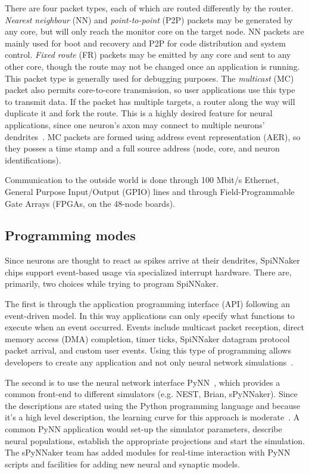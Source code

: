 There are four packet types, each of which are routed differently by the router. \emph{Nearest neighbour} (NN) and \emph{point-to-point} (P2P) packets may be generated by any core, but will only reach the monitor core on the target node. NN packets are mainly used for boot and recovery and P2P for code distribution and system control. \emph{Fixed route} (FR) packets may be emitted by any core and sent to any other core, though the route may not be changed once an application is running. This packet type is generally used for debugging purposes.
The \emph{multicast} (MC) packet also permits core-to-core transmission, so user applications use this type to transmit data. If the packet has multiple targets, a router along the way will duplicate it and fork the route. This is a highly desired feature for neural applications, since one neuron's axon may connect to multiple neurons' dendrites~\cite{spinn-net-patterson2012scalable}. MC packets are formed using address event representation (AER), so they posses a time stamp and a full source address (node, core, and neuron identifications).

Communication to the outside world is done through 100 Mbit/s Ethernet, General Purpose Input/Output (GPIO) lines and through Field-Programmable Gate Arrays (FPGAs, on the 48-node boards).

\subsection{Programming modes}
Since neurons are thought to react as spikes arrive at their dendrites, SpiNNaker chips support event-based usage via specialized interrupt hardware. There are, primarily, two choices while trying to program SpiNNaker. 

The first is through the application programming interface (API) following an event-driven model. In this way applications can only specify what functions to execute when an event occurred. Events include multicast packet reception, direct memory access (DMA) completion, timer ticks, SpiNNaker datagram protocol packet arrival, and custom user events. Using this type of programming allows developers to create any application and not only neural network simulations~\cite{spinn-software-docs}. 

The second is to use the neural network interface PyNN~\cite{davison2008pynn}, which provides a common front-end to different simulators (e.g. NEST, Brian, sPyNNaker). Since the descriptions are stated using the Python programming language and because it's a high level description, the learning curve for this approach is moderate~\cite{spynnaker-github}. A common PyNN application would set-up the simulator parameters, describe neural populations, establish the appropriate projections and start the simulation. The sPyNNaker team has added modules for real-time interaction with PyNN scripts and facilities for adding new neural and synaptic models.